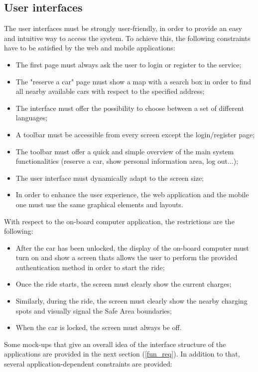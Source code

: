 \subsection{User interfaces}
The user interfaces must be strongly user-friendly, in order to provide an easy and intuitive way to access the system. To achieve this, the following constraints have to be satisfied by the web and mobile applications:
\begin{itemize}
\item The first page must always ask the user to login or register to the service;
\item The "reserve a car" page must show a map with a search box in order to find all nearby available cars with respect to the specified address;
\item The interface must offer the possibility to choose between a set of different languages;
\item A toolbar must be accessible from every screen except the login/register page;
\item The toolbar must offer a quick and simple overview of the main system functionalities (reserve a car, show personal information area, log out...);
\item The user interface must dynamically adapt to the screen size;
\item In order to enhance the user experience, the web application and the mobile one must use the same graphical elements and layouts.
\end{itemize}
With respect to the on-board computer application, the restrictions are the following:
\begin{itemize}
\item After the car has been unlocked, the display of the on-board computer must turn on and show a screen thats allows the user to perform the provided authentication method in order to start the ride;
\item Once the ride starts, the screen must clearly show the current charges;
\item Similarly, during the ride, the screen must clearly show the nearby charging spots and visually signal the Safe Area boundaries;
\item When the car is locked, the screen must always be off.
\end{itemize}
Some mock-ups that give an overall idea of the interface structure of the applications are provided in the next section (\ref{fun_req}).
In addition to that, several application-dependent constraints are provided:
